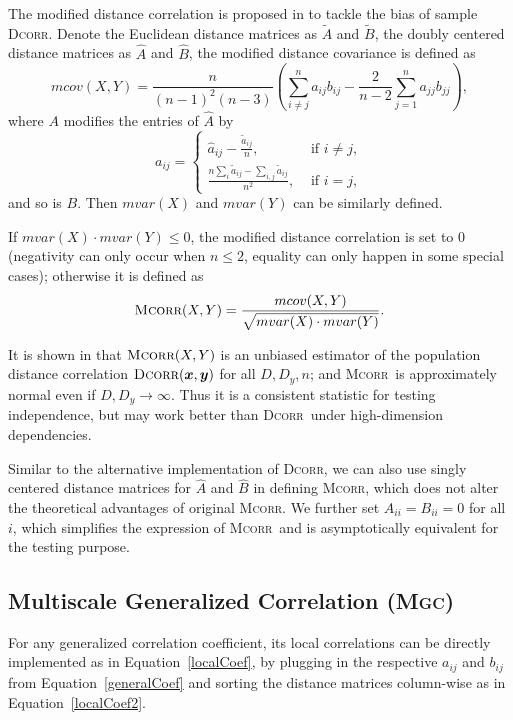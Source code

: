 \documentclass[11pt]{article}
\providecommand{\sct}[1]{{\normalfont\textsc{#1}}}
\providecommand{\mb}[1]{\boldsymbol{#1}}
\newcommand{\Mgc}{\sct{Mgc}}
\newcommand{\Dcorr}{\sct{Dcorr}}
\newcommand{\Mcorr}{\sct{Mcorr}}
\begin{document}
The modified distance correlation is proposed in \cite{SzekelyRizzo2013a} to tackle the bias of sample \Dcorr. Denote the Euclidean distance matrices as $\tilde{A}$ and $\tilde{B}$, the doubly centered distance matrices as $\hat{A}$ and $\hat{B}$, the modified distance covariance is defined as
\begin{equation*}
mcov(X,Y)=\frac{n}{(n-1)^2(n-3)}\left(\sum_{i \neq j}^{n}a_{ij}b_{ij}-\frac{2}{n-2}\sum_{j=1}^{n}a_{jj}b_{jj}\right),
\end{equation*}
where $A$ modifies the entries of $\hat{A}$ by
\[a_{ij} = \left\{
  \begin{array}{lr}
    \hat{a}_{ij}-\frac{\tilde{a}_{ij}}{n}, & \mbox{ if } i \neq j, \\
    \frac{n\sum_{i}\tilde{a}_{ij}-\sum_{i,j}\tilde{a}_{ij}}{n^2}, &\mbox{ if } i = j,
  \end{array}
\right.
\]
and so is $B$. Then $mvar(X)$ and $mvar(Y)$ can be similarly defined.

If $mvar(X) \cdot mvar(Y) \leq 0$, the modified distance correlation is set to $0$ (negativity can only occur when $n\leq 2$, equality can only happen in some special cases); otherwise it is defined as
\begin{equation*}
\Mcorr(X,Y)=\frac{mcov(X,Y)}{\sqrt{mvar(X) \cdot mvar(Y)}}.
\end{equation*}

It is shown in \cite{SzekelyRizzo2013a} that $\Mcorr(X,Y)$ is an unbiased estimator of the population distance correlation $\Dcorr(\mb{x},\mb{y})$ for all $D, D_{y}, n$; and \Mcorr~is approximately normal even if $D,D_{y} \rightarrow \infty$. Thus it is a consistent statistic for testing independence, but may work better than \Dcorr~under high-dimension dependencies.

Similar to the alternative implementation of \Dcorr, we can also use singly centered distance matrices for $\hat{A}$ and $\hat{B}$ in defining \Mcorr, which does not alter the theoretical advantages of original \Mcorr. We further set $A_{ii}=B_{ii}=0$ for all $i$, which simplifies the expression of \Mcorr~and is asymptotically equivalent for the testing purpose.


\subsection{Multiscale Generalized Correlation (\Mgc)}
\label{appen:mgc}
For any generalized correlation coefficient, its local correlations can be directly implemented as in Equation~\ref{localCoef}, by plugging in the respective $a_{ij}$ and $b_{ij}$ from Equation~\ref{generalCoef} and sorting the distance matrices column-wise as in Equation~\ref{localCoef2}.
\end{document}
